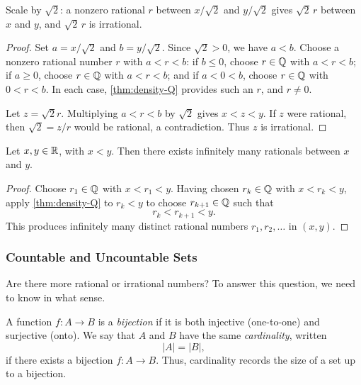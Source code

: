 \begin{idea}
    Scale by $\sqrt2$: a nonzero rational $r$ between $x/\sqrt2$ and $y/\sqrt2$ gives $\sqrt2\,r$ between $x$ and $y$, and $\sqrt2\,r$ is irrational.
\end{idea}
\begin{proof}
    Set $a=x/\sqrt2$ and $b=y/\sqrt2$. Since $\sqrt2>0$, we have $a<b$. Choose a nonzero rational number $r$ with $a<r<b$: if $b\leq0$, choose $r\in\mathbb{Q}$ with $a<r<b$; if $a\geq0$, choose $r\in\mathbb{Q}$ with $a<r<b$; and if $a<0<b$, choose $r\in\mathbb{Q}$ with $0<r<b$. In each case, \cref{thm:density-Q} provides such an $r$, and $r\neq0$.

    Let $z=\sqrt2r$. Multiplying $a<r<b$ by $\sqrt2$ gives $x<z<y$. If $z$ were rational, then $\sqrt2=z/r$ would be rational, a contradiction. Thus $z$ is irrational.
\end{proof}

\begin{corollary}\label{cor:infinitely-many-rationals}
    Let $x, y \in \mathbb{R}$, with $x < y$. Then there exists infinitely many rationals between $x$ and $y$. 
\end{corollary}

\begin{proof}
    Choose $r_1\in\mathbb{Q}$ with $x<r_1<y$. Having chosen $r_k\in\mathbb{Q}$ with $x<r_k<y$, apply \cref{thm:density-Q} to $r_k<y$ to choose $r_{k+1}\in\mathbb{Q}$ such that
    \[
        r_k<r_{k+1}<y.
    \]
    This produces infinitely many distinct rational numbers $r_1,r_2,\ldots$ in $(x,y)$.
\end{proof}

\subsubsection{Countable and Uncountable Sets}
Are there more rational or irrational numbers? To answer this question, we need to know in what sense. 
\begin{definition}
    [Cardinality]\label{def:cardinality}
    A function $f:A\to B$ is a \emph{bijection} if it is both injective (one-to-one) and surjective (onto). We say that $A$ and $B$ have the same \emph{cardinality}, written
    \[
        |A|=|B|,
    \]
    if there exists a bijection $f:A\to B$. Thus, cardinality records the size of a set up to a bijection.
\end{definition}

